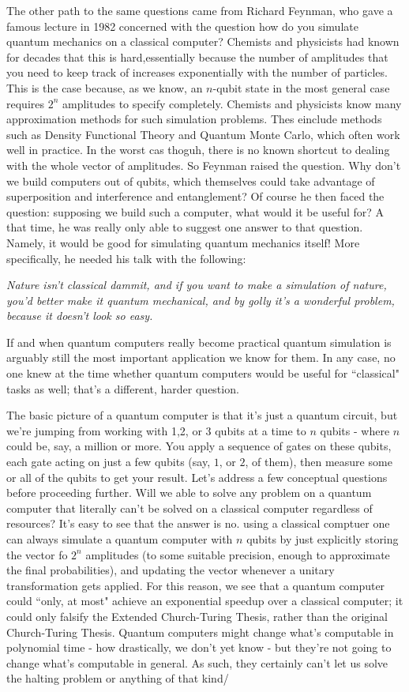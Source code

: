 The other path to the same questions came from Richard Feynman, who gave a famous lecture in 1982 concerned with the question how do you simulate quantum mechanics on a classical computer? Chemists and physicists had known for decades that this is hard,essentially because the number of amplitudes that you need to keep track of increases exponentially with the number of particles. This is the case because, as we know, an $n$-qubit state in the most general case requires $2^n$ amplitudes to specify completely. Chemists and physicists know many approximation methods for such simulation problems. Thes einclude methods such as Density Functional Theory and Quantum Monte Carlo, which often work well in practice. In the worst cas thoguh, there is no known shortcut to dealing with the whole vector of amplitudes. So Feynman raised the question. Why don't we build computers out of qubits, which themselves could take advantage of superposition and interference and entanglement? Of course he then faced the question: supposing we build such  a computer, what would it be useful for? A that time, he was really only able to suggest one answer to that question. Namely, it would be good for simulating quantum mechanics itself! More specifically, he needed his talk with the following:

\textit{Nature isn't classical dammit, and if you want to make a simulation of nature, you'd better make it quantum mechanical, and by golly it's a wonderful problem, because it doesn't look so easy.}

If and when quantum computers really become practical quantum simulation is arguably still the most important application we know for them. In any case, no one knew at the time whether quantum computers would be useful for ``classical" tasks as well; that's a different, harder question.


The basic picture of a quantum computer is that it's just a quantum circuit, but we're jumping from working with 1,2, or 3 qubits at a time to $n$ qubits - where $n$ could be, say, a million or more. You apply a sequence of gates on these qubits, each gate acting on just a few qubits (say, $1$, or $2$, of them), then measure some or all of the qubits to get your result.
Let's address a few conceptual questions before proceeding further. Will we able to solve any problem on a quantum computer that literally can't be solved on a classical computer regardless of resources? It's easy to see that the answer is no. using a classical comptuer one can always simulate a quantum computer with $n$ qubits by just explicitly storing the vector fo $2^n$ amplitudes (to some suitable precision, enough to approximate the final probabilities), and updating the vector whenever a unitary transformation gets applied. For this reason, we see that a quantum computer could ``only, at most" achieve an exponential speedup over a classical computer; it could only falsify the Extended Church-Turing Thesis, rather than the original Church-Turing Thesis. Quantum computers might change what's computable in polynomial time - how drastically, we don't yet know - but they're not going to change what's computable in general. As such, they certainly can't let us solve the halting problem or anything of that kind/

